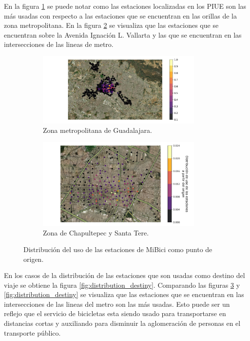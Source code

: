 En la figura \ref{fig:distribution_station_all_origin} se puede notar como las estaciones localizadas en los PIUE son las más usadas con respecto a las estaciones que se encuentran en las orillas de la zona metropolitana. En la figura \ref{fig:distribution_station_zoom_origin} se visualiza que las estaciones que se encuentran sobre la Avenida Ignación L. Vallarta y las que se encuentran en las intersecciones de las lineas de metro.

\begin{figure}[H]
    \centering
    \begin{subfigure}[b]{8.2cm}
        \includegraphics[width=8.2cm]{Graphics/repetition_origen.png}
        \caption{Zona metropolitana de Guadalajara.}
        \label{fig:distribution_station_all_origin}
    \end{subfigure}
    \begin{subfigure}[b]{8.2cm}
        \includegraphics[width=8.2cm]{Graphics/repetition_origen_zoom.png}
        \caption{Zona de Chapultepec y Santa Tere.}
        \label{fig:distribution_station_zoom_origin}
    \end{subfigure}
    \caption{Distribución del uso de las estaciones de MiBici como punto de origen.}
    \label{fig:distribution_origin}
\end{figure}

En los casos de la distribución de las estaciones que son usadas como destino del viaje se obtiene la figura \ref{fig:distribution_destiny}. Comparando las figuras \ref{fig:distribution_origin} y \ref{fig:distribution_destiny} se visualiza que las estaciones que se encuentran en las intersecciones de las lineas del metro son las más usadas. Esto puede ser un reflejo que el servicio de bicicletas esta siendo usado para transportarse en distancias cortas y auxiliando para disminuir la aglomeración de personas en el transporte público.

